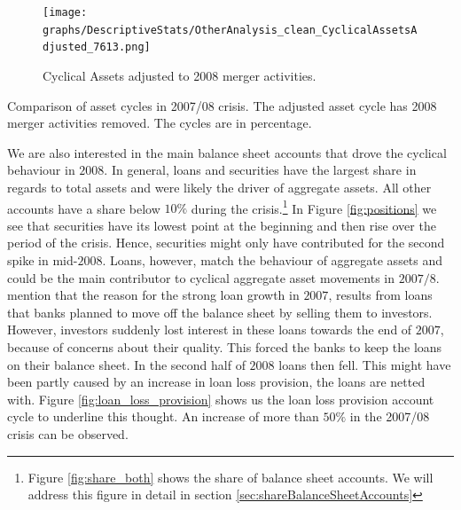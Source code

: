 \documentclass[12pt, a4paper]{article} %
\begin{document}
\begin{figure}[H]
\begin{minipage}{\textwidth}
\texttt{[image: graphs/DescriptiveStats/OtherAnalysis\_clean\_CyclicalAssetsAdjusted\_7613.png]}
\caption[1]{Cyclical Assets adjusted to 2008 merger activities.}
\label{fig:cyclial_assets_adjusted}
\end{minipage}
\end{figure}

\begin{table}[H]
\begin{minipage}{\textwidth}

\caption[1]{Comparison of asset cycles in 2007/08 crisis. The adjusted asset cycle has 2008 merger activities removed. The cycles are in percentage.}
\label{tab:cyclicalAssetsComparison_Crisis}
\end{minipage}
\end{table}


We are also interested in the main balance sheet accounts that drove the cyclical behaviour in $2008$. In general, loans and securities have the largest share in regards to total assets and were likely the driver of aggregate assets. All other accounts have a share below $10\%$ during the crisis.\footnote{Figure \ref{fig:share_both} shows the share of balance sheet accounts. We will address this figure in detail in section \ref{sec:shareBalanceSheetAccounts}} In Figure \ref{fig:positions} we see that securities have its lowest point at the beginning and then rise over the period of the crisis. Hence, securities might only have contributed for the second spike in mid-$2008$. Loans, however, match the behaviour of aggregate assets and could be the main contributor to cyclical aggregate asset movements in $2007/8$. \citet{bassett2008profits} mention that the reason for the strong loan growth in $2007$, results from loans that banks planned to move off the balance sheet by selling them to investors. However, investors suddenly lost interest in these loans towards the end of $2007$, because of concerns about their quality. This forced the banks to keep the loans on their balance sheet. 
In the second half of $2008$ loans then fell. This might have been partly caused by an increase in loan loss provision, the loans are netted with.
Figure \ref{fig:loan_loss_provision} shows us the loan loss provision account cycle to underline this thought. An increase of more than $50\%$ in the 2007/08 crisis can be observed.
\end{document}

